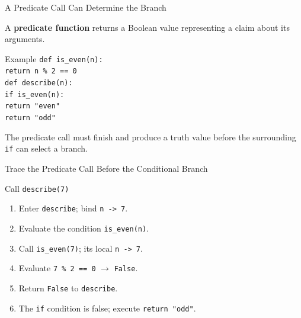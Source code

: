 \documentclass[aspectratio=169,10pt]{beamer}
\begin{document}

\begin{frame}{A Predicate Call Can Determine the Branch}
  \begin{cpdefinition}
    A \textbf{predicate function} returns a Boolean value representing a claim about its arguments.
  \end{cpdefinition}

  \begin{block}{Example}
    \texttt{def is\_even(n):}\\
    \hspace*{0.20in}\texttt{return n \% 2 == 0}\\[0.08in]
    \texttt{def describe(n):}\\
    \hspace*{0.20in}\texttt{if is\_even(n):}\\
    \hspace*{0.40in}\texttt{return "even"}\\
    \hspace*{0.20in}\texttt{return "odd"}
  \end{block}

  \begin{keyidea}
    The predicate call must finish and produce a truth value before the surrounding \texttt{if} can select a branch.
  \end{keyidea}
\end{frame}

\begin{frame}{Trace the Predicate Call Before the Conditional Branch}
  \begin{block}{Call}
    \centering
    \Large\texttt{describe(7)}
  \end{block}

  \begin{enumerate}
    \item Enter \texttt{describe}; bind \texttt{n -> 7}.
    \item Evaluate the condition \texttt{is\_even(n)}.
    \item Call \texttt{is\_even(7)}; its local \texttt{n -> 7}.
    \item Evaluate \texttt{7 \% 2 == 0} $\to$ \texttt{False}.
    \item Return \texttt{False} to \texttt{describe}.
    \item The \texttt{if} condition is false; execute \texttt{return "odd"}.
  \end{enumerate}
\end{frame}
\end{document}
